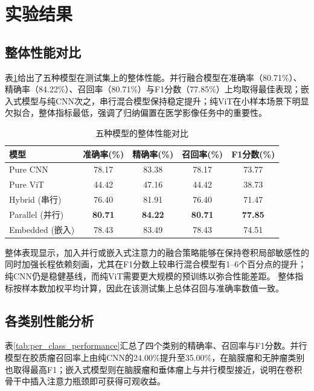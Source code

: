 \section{实验结果}

\subsection{整体性能对比}

表\ref{tab:overall_performance}给出了五种模型在测试集上的整体性能。并行融合模型在准确率（80.71\%）、精确率（84.22\%）、召回率（80.71\%）与F1分数（77.85\%）上均取得最佳表现；嵌入式模型与纯CNN次之，串行混合模型保持稳定提升；纯ViT在小样本场景下明显欠拟合，整体指标最低，强调了归纳偏置在医学影像任务中的重要性。

\begin{table}[h]
\centering
\caption{五种模型的整体性能对比}
\label{tab:overall_performance}
\begin{tabular}{lcccc}
\toprule
\textbf{模型} & \textbf{准确率(\%)} & \textbf{精确率(\%)} & \textbf{召回率(\%)} & \textbf{F1分数(\%)} \\
\midrule
Pure CNN & 78.17 & 83.38 & 78.17 & 73.77 \\
Pure ViT & 44.42 & 47.16 & 44.42 & 38.73 \\
Hybrid (串行) & 76.40 & 81.91 & 76.40 & 71.47 \\
Parallel (并行) & \textbf{80.71} & \textbf{84.22} & \textbf{80.71} & \textbf{77.85} \\
Embedded (嵌入) & 78.43 & 83.49 & 78.43 & 74.51 \\
\bottomrule
\end{tabular}
\end{table}

整体表现显示，加入并行或嵌入式注意力的融合策略能够在保持卷积局部敏感性的同时加强长程依赖刻画，尤其在F1分数上较串行混合模型有1--6个百分点的提升；纯CNN仍是稳健基线，而纯ViT需要更大规模的预训练以弥合性能差距。
整体指标按样本数加权平均计算，因此在该测试集上总体召回与准确率数值一致。

\subsection{各类别性能分析}

表\ref{tab:per_class_performance}汇总了四个类别的精确率、召回率与F1分数。并行模型在胶质瘤召回率上由纯CNN的24.00\%提升至35.00\%，在脑膜瘤和无肿瘤类别也取得最高F1；嵌入式模型则在脑膜瘤和垂体瘤上与并行模型接近，说明在卷积骨干中插入注意力瓶颈即可获得可观收益。


